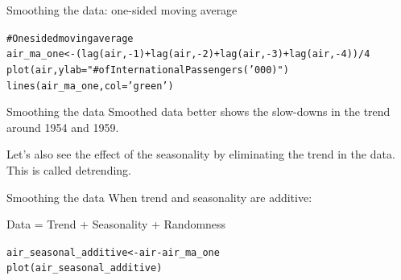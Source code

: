 \documentclass{beamer}\usepackage[]{graphicx}\usepackage[]{color}
\makeatletter
\newcommand{\hlnum}[1]{\textcolor[rgb]{0.824,0.412,0.118}{#1}}%
\newcommand{\hlstr}[1]{\textcolor[rgb]{1,0.894,0.71}{#1}}%
\newcommand{\hlcom}[1]{\textcolor[rgb]{0.824,0.706,0.549}{#1}}%
\newcommand{\hlopt}[1]{\textcolor[rgb]{1,0.894,0.769}{#1}}%
\newcommand{\hlstd}[1]{\textcolor[rgb]{1,0.894,0.769}{#1}}%
\newcommand{\hlkwb}[1]{\textcolor[rgb]{0.804,0.776,0.451}{#1}}%
\newcommand{\hlkwc}[1]{\textcolor[rgb]{0.78,0.941,0.545}{#1}}%
\newcommand{\hlkwd}[1]{\textcolor[rgb]{1,0.78,0.769}{#1}}%
\newenvironment{kframe}{%
 \def\at@end@of@kframe{}%
 \ifinner\ifhmode%
  \def\at@end@of@kframe{\end{minipage}}%
  \begin{minipage}{\columnwidth}%
 \fi\fi%
 \def\FrameCommand##1{\hskip\@totalleftmargin \hskip-\fboxsep
 \colorbox{shadecolor}{##1}\hskip-\fboxsep
     \hskip-\linewidth \hskip-\@totalleftmargin \hskip\columnwidth}%
 \MakeFramed {\advance\hsize-\width
   \@totalleftmargin\z@ \linewidth\hsize
   \@setminipage}}%
 {\par\unskip\endMakeFramed%
 \at@end@of@kframe}
\newenvironment{knitrout}{}{} %
\makeatother
\begin{document}
\begin{darkframes}
\begin{frame}[fragile]{Smoothing the data: one-sided moving average}
\begin{knitrout}
\begin{kframe}
\begin{alltt}
\hlcom{# One sided moving average}
\hlstd{air_ma_one} \hlkwb{<-} \hlstd{(}\hlkwd{lag}\hlstd{(air,} \hlopt{-}\hlnum{1}\hlstd{)} \hlopt{+} \hlkwd{lag}\hlstd{(air,} \hlopt{-}\hlnum{2}\hlstd{)} \hlopt{+} \hlkwd{lag}\hlstd{(air,} \hlopt{-}\hlnum{3}\hlstd{)} \hlopt{+} \hlkwd{lag}\hlstd{(air,} \hlopt{-}\hlnum{4}\hlstd{))}\hlopt{/}\hlnum{4}
\hlkwd{plot}\hlstd{(air,} \hlkwc{ylab}\hlstd{=}\hlstr{"# of International Passengers ('000)"}\hlstd{)}
\hlkwd{lines}\hlstd{(air_ma_one,} \hlkwc{col}\hlstd{=}\hlstr{'green'}\hlstd{)}
\end{alltt}
\end{kframe}


\end{knitrout}
      \lc
    \end{frame}
    
    
    
    
    \begin{frame}[fragile]{Smoothing the data}
      Smoothed data better shows the slow-downs in the trend around 1954 and 1959.
      \bigskip
      
      Let's also see the effect of the seasonality by eliminating the trend in the data. This is called \alert{detrending}.

    \end{frame}
    
    
    
    \begin{frame}[fragile]{Smoothing the data}
      \fontsize{9}{9}\selectfont
      When trend and seasonality are additive:
      \begin{center}
        Data = Trend + Seasonality + Randomness
      \end{center}
     
\begin{knitrout}
\begin{kframe}
\begin{alltt}
\hlstd{air_seasonal_additive} \hlkwb{<-} \hlstd{air} \hlopt{-} \hlstd{air_ma_one}
\hlkwd{plot}\hlstd{(air_seasonal_additive)}
\end{alltt}
\end{kframe}



\end{knitrout}
\end{frame}
\end{darkframes}
\end{document}
